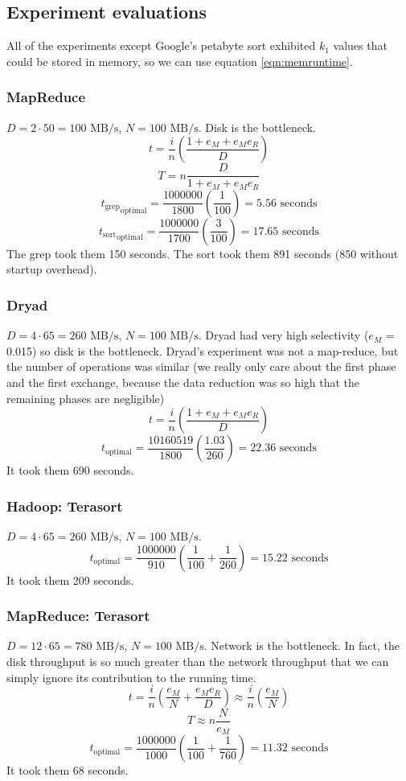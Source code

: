 \documentclass{acm_proc_article-sp}
\begin{document}
\subsection{Experiment evaluations}
All of the experiments except Google's petabyte sort exhibited $k_1$ values that could be stored in memory, so we can use equation \ref{eqn:memruntime}.
\subsubsection{MapReduce}
$D = 2 \cdot 50 = 100 \text{ MB/s}$, $N = 100 \text{ MB/s}$. Disk is the bottleneck. 
\[t = \frac{i}{n} \left( \frac{1 + e_M + e_M e_R}{D} \right)\]
\[T = n \frac{D}{1 + e_M + e_M e_R}\]
\[{t_\text{grep}}_\text{optimal} = \frac{1000000}{1800} \left( \frac{1}{100} \right) = 5.56 \text{ seconds}\]
\[{t_\text{sort}}_\text{optimal} = \frac{1000000}{1700} \left( \frac{3}{100} \right) = 17.65 \text{ seconds}\]
The grep took them 150 seconds. The sort took them 891 seconds (850 without startup overhead).

\subsubsection{Dryad}
$D = 4 \cdot 65 = 260 \text{ MB/s}$, $N = 100 \text{ MB/s}$.
Dryad had very high selectivity ($e_M$ = 0.015) so disk is the bottleneck.
Dryad's experiment was not a map-reduce, but the number of operations was similar (we really only care about the first phase and the first exchange, because the data reduction was so high that the remaining phases are negligible)
\[t = \frac{i}{n} \left( \frac{1 + e_M + e_M e_R}{D} \right)\]
\[t_\text{optimal} = \frac{10160519}{1800} \left( \frac{1.03}{260} \right) = 22.36 \text{ seconds}\]
It took them 690 seconds.

\subsubsection{Hadoop: Terasort}
$D = 4 \cdot 65 = 260 \text{ MB/s}$, $N = 100 \text{ MB/s}$.
\[t_\text{optimal} = \frac{1000000}{910} \left( \frac{1}{100} + \frac{1}{260} \right) = 15.22 \text{ seconds}\]
It took them 209 seconds.

\subsubsection{MapReduce: Terasort}
$D = 12 \cdot 65 = 780 \text{ MB/s}$, $N = 100 \text{ MB/s}$. Network is the bottleneck. In fact, the disk throughput is so much greater than the network throughput that we can simply ignore its contribution to the running time.
\[t = \frac{i}{n} \left( \frac{e_M}{N} + \frac{e_M e_R}{D} \right) \approx \frac{i}{n} \left( \frac{e_M}{N} \right)\]
\[T \approx n \frac{N}{e_M}\]
\[t_\text{optimal} = \frac{1000000}{1000} \left(\frac{1}{100} + \frac{1}{760} \right) = 11.32 \text{ seconds}\]
It took them 68 seconds.
\end{document}
